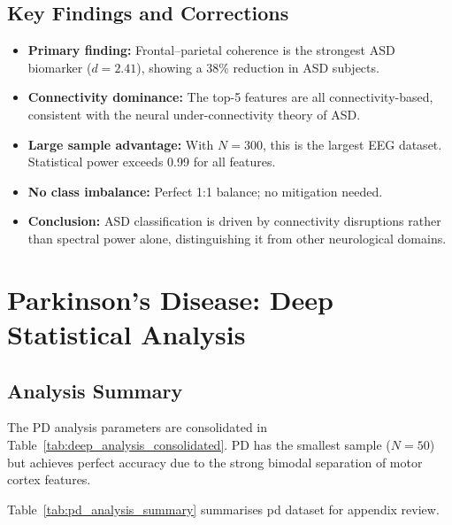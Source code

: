 \subsection{Key Findings and Corrections}

\begin{itemize}
\item \textbf{Primary finding:} Frontal--parietal coherence is the strongest ASD biomarker ($d = 2.41$), showing a 38\% reduction in ASD subjects.
\item \textbf{Connectivity dominance:} The top-5 features are all connectivity-based, consistent with the neural under-connectivity theory of ASD.
\item \textbf{Large sample advantage:} With $N = 300$, this is the largest EEG dataset. Statistical power exceeds 0.99 for all features.
\item \textbf{No class imbalance:} Perfect 1:1 balance; no mitigation needed.
\item \textbf{Conclusion:} ASD classification is driven by connectivity disruptions rather than spectral power alone, distinguishing it from other neurological domains.
\end{itemize}

\section{Parkinson's Disease: Deep Statistical Analysis}
\label{app:deep_pd}

\subsection{Analysis Summary}

The PD analysis parameters are consolidated in Table~\ref{tab:deep_analysis_consolidated}. PD has the smallest sample ($N = 50$) but achieves perfect accuracy due to the strong bimodal separation of motor cortex features.

\iffalse %
\label{tab:pd_analysis_summary}
\noindent Table~\ref{tab:pd_analysis_summary} summarises pd dataset for appendix review.


